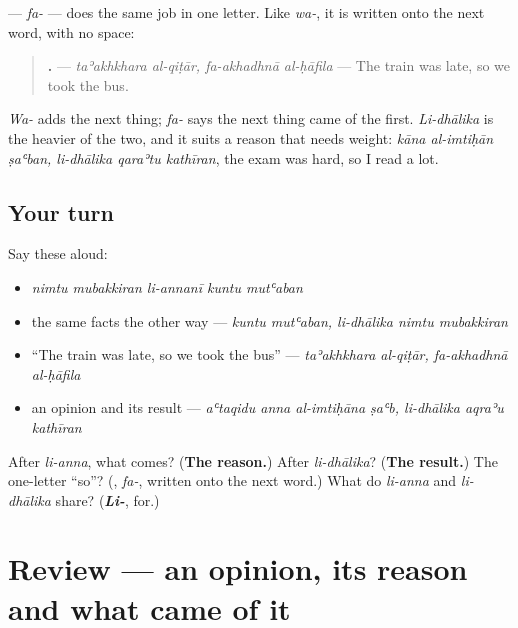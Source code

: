 \begin{grammarlens}[title={Grammar Lens: fa-, the short \textquotedblleft{}so\textquotedblright{}}]
\textbf{} — \emph{fa-} — does the same job in one letter. Like \emph{wa-}, it is written onto the next word, with no space:

\begin{quote}
\textbf{   .} — \emph{taʾakhkhara al-qiṭār, fa-akhadhnā al-ḥāfila} — The train was late, so we took the bus.
\end{quote}

\emph{Wa-} adds the next thing; \emph{fa-} says the next thing came of the first. \emph{Li-dhālika} is the heavier of the two, and it suits a reason that needs weight: \emph{kāna al-imtiḥān ṣaʿban, li-dhālika qaraʾtu kathīran}, the exam was hard, so I read a lot.
\end{grammarlens}

\subsection*{Your turn}
Say these aloud:

\begin{itemize}
\raggedright
  \item \emph{nimtu mubakkiran li-annanī kuntu mutʿaban}
  \item the same facts the other way — \emph{kuntu mutʿaban, li-dhālika nimtu mubakkiran}
  \item \textquotedblleft{}The train was late, so we took the bus\textquotedblright{} — \emph{taʾakhkhara al-qiṭār, fa-akhadhnā al-ḥāfila}
  \item an opinion and its result — \emph{aʿtaqidu anna al-imtiḥāna ṣaʿb, li-dhālika aqraʾu kathīran}
\end{itemize}

\begin{tcolorbox}[breakable,colback=teal!4,colframe=teal!35!black,title={Before you move on}]
After \emph{li-anna}, what comes? (\textbf{The reason.}) After \emph{li-dhālika}? (\textbf{The result.}) The one-letter \textquotedblleft{}so\textquotedblright{}? (\textbf{}, \emph{fa-}, written onto the next word.) What do \emph{li-anna} and \emph{li-dhālika} share? (\emph{\textbf{Li-}}, for.)
\end{tcolorbox}
\section[(review)]{Review — an opinion, its reason and what came of it}

